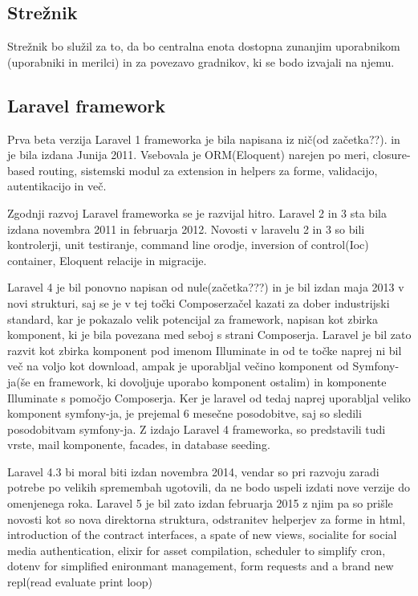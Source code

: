 \documentclass[12pt,a4paper,titlepage,openany]{report}
\begin{document}
\subsection{Strežnik}
Strežnik bo služil za to, da bo centralna enota dostopna zunanjim uporabnikom (uporabniki in merilci) in za povezavo gradnikov, ki se bodo izvajali na njemu.


\subsection{Laravel framework}
Prva beta verzija Laravel 1 frameworka je bila napisana iz nič(od začetka??). in je bila izdana Junija 2011. Vsebovala je ORM(Eloquent) narejen po meri, closure-based routing, sistemski modul za extension in helpers za forme, validacijo, autentikacijo in več.

Zgodnji razvoj Laravel frameworka se je razvijal hitro. Laravel 2 in 3 sta bila izdana novembra 2011 in februarja 2012. Novosti v laravelu 2 in 3 so bili kontrolerji, unit testiranje, command line orodje, inversion of control(Ioc) container, Eloquent relacije in migracije.

Laravel 4 je bil ponovno napisan od nule(začetka???) in je bil izdan maja 2013 v novi strukturi, saj se je v tej točki Composerzačel kazati za dober industrijski standard, kar je pokazalo velik potencijal za framework, napisan kot zbirka komponent, ki je bila povezana med seboj s strani Composerja. Laravel je bil zato razvit kot zbirka komponent pod imenom Illuminate in od te točke naprej ni bil več na voljo kot download, ampak je uporabljal večino komponent od Symfony-ja(še en framework, ki dovoljuje uporabo komponent ostalim) in komponente Illuminate s pomočjo Composerja. Ker je laravel od tedaj naprej uporabljal veliko komponent symfony-ja, je prejemal 6 mesečne posodobitve, saj so sledili posodobitvam symfony-ja. Z izdajo Laravel 4 frameworka, so predstavili tudi vrste, mail komponente, facades, in database seeding.

Laravel 4.3 bi moral biti izdan novembra 2014, vendar so pri razvoju zaradi potrebe po velikih spremembah ugotovili, da ne bodo uspeli izdati nove verzije do omenjenega roka. Laravel 5 je bil zato izdan februarja 2015 z njim pa so prišle novosti kot so nova direktorna struktura, odstranitev helperjev za forme in html, introduction of the contract interfaces, a spate of new views, socialite for social media authentication, elixir for asset compilation, scheduler to simplify cron, dotenv for simplified enironmant management, form requests and a brand new repl(read evaluate print loop)
\end{document}
